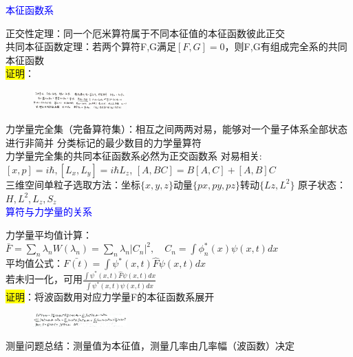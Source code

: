 \documentclass[a4paper,8pt]{extarticle} %
\newcommand{\bluetext}[1]{\textcolor{blue}{#1}}
\newcommand{\yellowback}[1]{\colorbox{yellow}{#1}}
\begin{document}
\begin{multicols}{3}
\bluetext{本征函数系}

正交性定理：同一个厄米算符属于不同本征值的本征函数彼此正交\\
共同本征函数定理：若两个算符F,G满足$[F,G]=0$，则F,G有组成完全系的共同本征函数\\
\yellowback{证明}：
\begin{figure}[H]
    \vspace{-0.5cm}
    \centering
    \includegraphics[width=0.32\textwidth]{images/34.jpg}
    \vspace{-0.6cm}
\end{figure}
力学量完全集（完备算符集）：相互之间两两对易，能够对一个量子体系全部状态进行非简并
分类标记的最少数目的力学量算符\\
力学量完全集的共同本征函数系必然为正交函数系
对易相关: $[x,p] = i\hbar, [L_x,L_y] = i\hbar L_z$,
$[A,BC]=B[A,C]+[A,B]C$\\
三维空间单粒子选取方法：坐标$\{x,y,z\}$动量$\{px,py,pz\}$转动$\{Lz,L^2\}$
原子状态：$H,L^2,L_z,S_z$\\
\bluetext{算符与力学量的关系}

力学量平均值计算：\\ $\bar{F} = \sum_n \lambda_n W(\lambda_n) = \sum_n \lambda_n |C_n|^2, \quad C_n = \int \phi_n^*(x) \psi(x,t) dx$\\
平均值公式：$\bar{F(t)} = \int \psi^*(x,t) \hat{F} \psi(x,t) dx$\\
若未归一化，可用$\frac{\int \psi^*(x,t) \hat{F} \psi(x,t) dx}{\int \psi^*(x,t) \psi(x,t) dx}$\\
\yellowback{证明}：将波函数用对应力学量F的本征函数系展开
\begin{figure}[H]
    \vspace{-0.5cm}
    \centering
    \includegraphics[width=0.32\textwidth]{images/9.png}
    \vspace{-0.6cm}
\end{figure}
测量问题总结：测量值为本征值，测量几率由几率幅（波函数）决定


\end{multicols}
\end{document}
